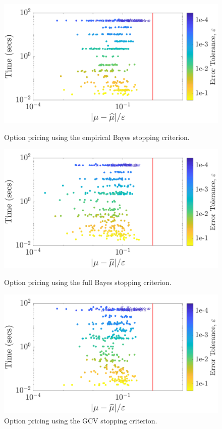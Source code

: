 \documentclass[twocolumn]{svjour3}          %
\begin{document}
\begin{figure}
	\centering
	\includegraphics[width=0.95\linewidth]{"Lattice_optPrice_guaranteed_time_MLE_Baker_d12_r1_2019-Jul-9"}
	\caption[Option pricing Guaranteed: MLE]{Option pricing using the empirical Bayes stopping criterion.}
	\label{fig:optprice-guaranteed-MLE}
	\centering
	\includegraphics[width=0.95\linewidth]{"Lattice_optPrice_guaranteed_time_full_Baker_d12_r1_2019-Jul-9"}
	\caption[OptPrice guaranteed : FB]{Option pricing using the full Bayes stopping criterion.}
	\label{fig:optprice-guaranteed-FB}
	\centering
	\includegraphics[width=0.95\linewidth]{"Lattice_optPrice_guaranteed_time_GCV_Baker_d12_r1_2019-Jul-8"}
	\caption[OptPrice guaranteed : GCV]{Option pricing using the  GCV stopping criterion.}
	\label{fig:optprice-guaranteed-GCV}
\end{figure}
\end{document}
